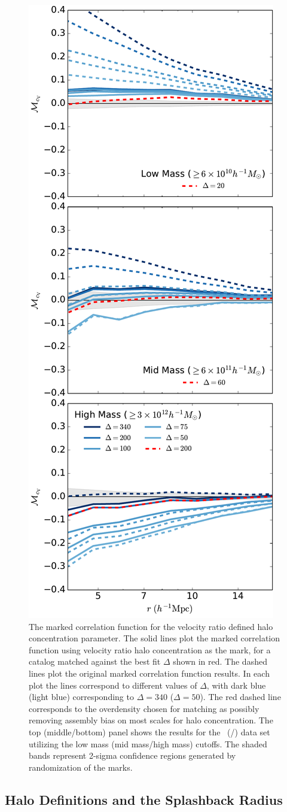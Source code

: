 \documentclass[usenatbib,fleqn]{mnras}
\begin{document}
\begin{figure}
	\centering
	\includegraphics[width=.4\textwidth]{match_mcf_cV.pdf}
	\caption{The marked correlation function for the velocity ratio defined halo concentration parameter. The solid lines plot the marked correlation function using velocity ratio halo concentration as the mark, for a catalog matched against the best fit $\Delta$ shown in red. The dashed lines plot the original marked correlation function results. In each plot the lines correspond to different values of $\Delta$, with dark blue (light blue) corresponding to $\Delta = 340$ ($\Delta = 50$). The red dashed line corresponds to the overdensity chosen for matching as possibly removing assembly bias on most scales for halo concentration. The top (middle/bottom) panel shows the results for the
\simA \ (\simB /\simC) data set utilizing the low mass (mid mass/high mass) cutoffs. The shaded bands represent 2-sigma confidence regions generated by randomization of the marks.}
	\label{fig:hvm_mcf_cV}
\end{figure}

\subsection{Halo Definitions and the Splashback Radius}
\end{document}
